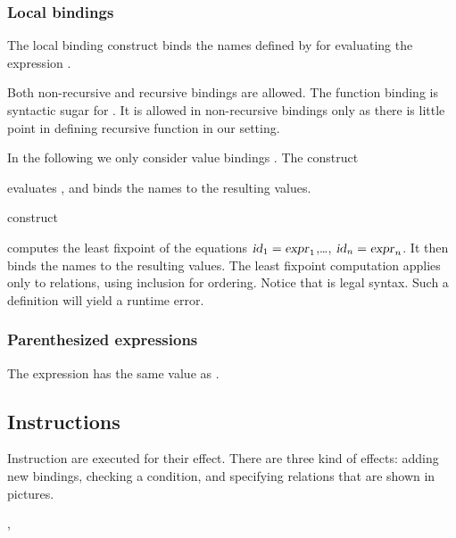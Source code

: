 \subsubsection*{\label{bindings}Local bindings}
The local binding construct
binds the names defined by  
for evaluating the expression .

Both non-recursive and recursive bindings are allowed.
The function binding
 is syntactic sugar
for .
It is allowed in non-recursive bindings only as there is little point
in defining recursive function in our setting.

In the following we only consider value bindings .
The construct
\begin{center}
  
\end{center}
evaluates ,
and binds the names   to the resulting values.

 construct
\begin{center}
  
\end{center}
computes the least fixpoint of the equations
$\hbox{\sl id\/}_1 = \hbox{\sl expr\/}_1$,\ldots, $\hbox{\sl id\/}_n = \hbox{\sl expr\/}_n$.
It then binds the names  to the
resulting values.
The least fixpoint computation applies only to relations, using
inclusion for ordering.
Notice that
 is legal syntax. Such a definition will yield
a runtime error.

\subsubsection*{Parenthesized expressions}
The expression
 has the same value as .

\subsection{\label{language:instruction}Instructions}
Instruction are executed for their  effect.
There are three kind of effects: adding new bindings,
checking a condition, and specifying relations that are shown in pictures.
\begin{syntax}
 \is{}   \brepet{}   \erepet{}
\alt {}   \brepet{}   \erepet{}
\alt {}  \boption {} \eoption
\alt {}   
\alt {}  \brepet \T{,}  \erepet
\alt {}  \brepet \T{,}  \erepet
\alt {} 
\sep
{} \is {} \orelse {} \orelse {}
\end{syntax}

